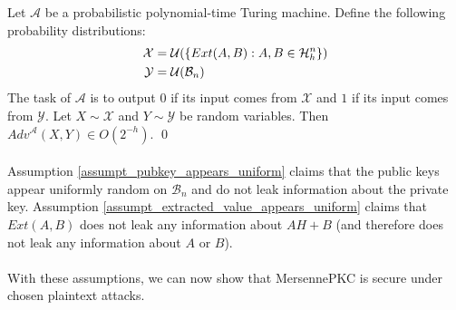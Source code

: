 \begin{assumption}\label{assumpt_extracted_value_appears_uniform}
Let $\mathcal{A}$ be a probabilistic polynomial-time Turing machine. Define the following probability distributions:
\begin{align*}
\mathcal{X} &= \mathcal{U}(\{ Ext(A, B): A, B \in \mathcal{H}_h^n  \})\\
\mathcal{Y} &= \mathcal{U}(\mathcal{B}_n)
\end{align*}
The task of $\mathcal{A}$ is to output $0$ if its input comes from $\mathcal{X}$ and $1$ if its input comes from $\mathcal{Y}$. Let $X \sim \mathcal{X}$ and $Y \sim \mathcal{Y}$ be random variables. Then $Adv^\mathcal{A}(X, Y) \in O(2^{-h})$.
\qed
\end{assumption}

\paragraph{}
Assumption \ref{assumpt_pubkey_appears_uniform} claims that the public keys appear uniformly random on $\mathcal{B}_n$ and do not leak information about the private key. Assumption \ref{assumpt_extracted_value_appears_uniform} claims that $Ext(A, B)$ does not leak any information about $AH+B$ (and therefore does not leak any information about $A$ or $B$).

\paragraph{}
With these assumptions, we can now show that MersennePKC is secure under chosen plaintext attacks.

